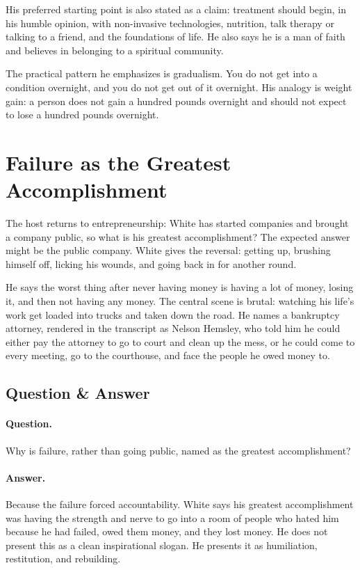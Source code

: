 His preferred starting point is also stated as a claim: treatment should begin, in his humble opinion, with non-invasive technologies, nutrition, talk therapy or talking to a friend, and the foundations of life. He also says he is a man of faith and believes in belonging to a spiritual community.

The practical pattern he emphasizes is gradualism. You do not get into a condition overnight, and you do not get out of it overnight. His analogy is weight gain: a person does not gain a hundred pounds overnight and should not expect to lose a hundred pounds overnight.

\section{Failure as the Greatest Accomplishment}

The host returns to entrepreneurship: White has started companies and brought a company public, so what is his greatest accomplishment? The expected answer might be the public company. White gives the reversal: getting up, brushing himself off, licking his wounds, and going back in for another round.

He says the worst thing after never having money is having a lot of money, losing it, and then not having any money. The central scene is brutal: watching his life's work get loaded into trucks and taken down the road. He names a bankruptcy attorney, rendered in the transcript as Nelson Hemsley, who told him he could either pay the attorney to go to court and clean up the mess, or he could come to every meeting, go to the courthouse, and face the people he owed money to.

\subsection{Question \& Answer}

\paragraph{Question.} Why is failure, rather than going public, named as the greatest accomplishment?

\paragraph{Answer.} Because the failure forced accountability. White says his greatest accomplishment was having the strength and nerve to go into a room of people who hated him because he had failed, owed them money, and they lost money. He does not present this as a clean inspirational slogan. He presents it as humiliation, restitution, and rebuilding.

